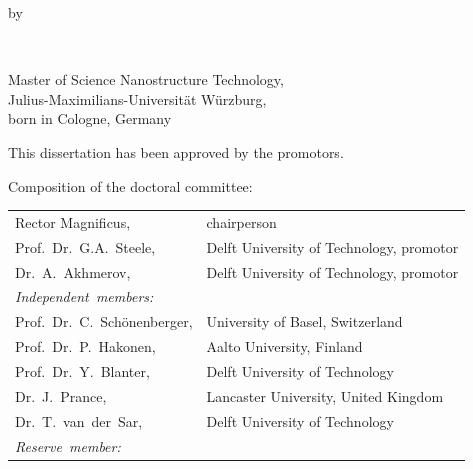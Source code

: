 \begin{titlepage}
\begin{center}
\bigskip
\bigskip

by

\bigskip
\bigskip

\makeatletter
{\Large\titlefont\bfseries\@firstname\ {\titleshape\@lastname}}
\makeatother

\bigskip
\bigskip

Master of Science Nanostructure Technology, \\
Julius-Maximilians-Universität Würzburg, \\
born in Cologne, Germany

\vspace*{2\bigskipamount}

\end{center}

\clearpage
\thispagestyle{empty}

\noindent This dissertation has been approved by the promotors.

\bigskip
\noindent Composition of the doctoral committee:

\medskip\noindent
\begin{tabular}{p{3.5cm}l}
    Rector Magnificus, & chairperson \\
%    
    Prof.~Dr.~G.A.~Steele, & Delft University of Technology, promotor \\
%    
    Dr.~A.~Akhmerov, & Delft University of Technology, promotor \\

    \medskip
    \mbox{\emph{Independent members:}} & \\
    
    Prof.~Dr.~C.~Schönenberger, & University of Basel, Switzerland \\
%    
    Prof.~Dr.~P.~Hakonen, & Aalto University, Finland \\
%    
    Prof.~Dr.~Y.~Blanter, & Delft University of Technology \\
%    
    Dr.~J.~Prance, & Lancaster University, United Kingdom \\
%
    Dr.~T.~van~der~Sar, & Delft University of Technology \\
    
    \medskip
    \mbox{\emph{Reserve member:}} & \\


\end{tabular}
\end{titlepage}
